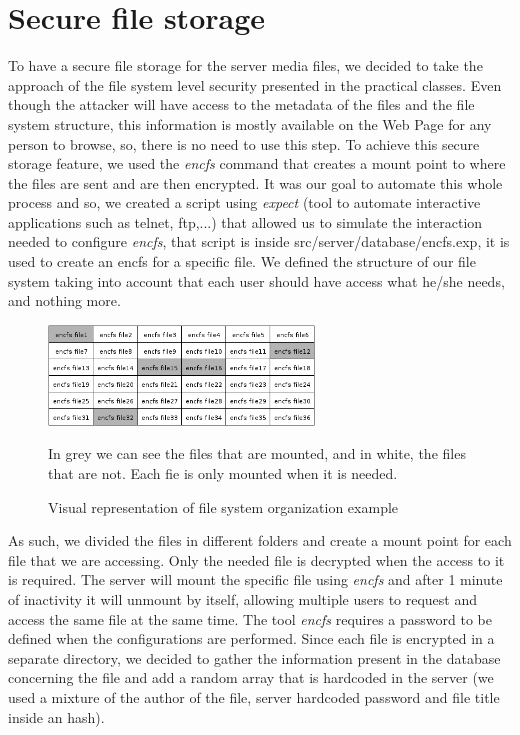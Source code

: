 \documentclass[11pt,a4paper]{report}
\begin{document}
\chapter{Secure file storage}
To have a secure file storage for the server media files, we decided to take the approach of the file system level security presented in the practical classes. Even though the attacker will have access to the metadata of the files and the file system structure, this information is mostly available on the Web Page for any person to browse, so, there is no need to use this step.
\newline
To achieve this secure storage feature, we used the \emph{encfs} command that creates a mount point to where the files are sent and are then encrypted.
\newline
It was our goal to automate this whole process and so, we created a script using \emph{expect} (tool to automate interactive applications such as telnet, ftp,...) that allowed us to simulate the interaction needed to configure \emph{encfs}, that script is inside src/server/database/encfs.exp, it is used to create an encfs for a specific file.
\newline
We defined the structure of our file system taking into account that each user should have access what he/she needs, and nothing more.
\begin{figure}[H]
\centerline{\includegraphics[width=200pt]{images/matrix.png}}
\caption{Visual representation of file system organization example}
\medskip
\small
In grey we can see the files that are mounted, and in white, the files that are not. Each fie is only mounted when it is needed.
\label{player}
\end{figure}

As such, we divided the files in different folders and create a mount point for each file that we are accessing. Only the needed file is decrypted when the access to it is required. The server will mount the specific file using \emph{encfs} and after 1 minute of inactivity it will unmount by itself, allowing multiple users to request and access the same file at the same time.
\newline
The tool \emph{encfs} requires a password to be defined when the configurations are performed. Since each file is encrypted in a separate directory, we decided to gather the information present in the database concerning the file and add a random array that is hardcoded in the server (we used a mixture of the author of the file, server hardcoded password and file title inside an hash).
\end{document}
